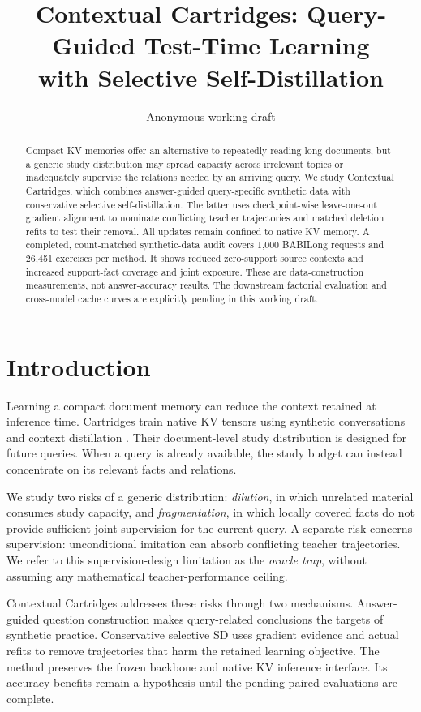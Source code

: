 \documentclass[11pt]{article}
\title{Contextual Cartridges: Query-Guided Test-Time Learning\\with Selective Self-Distillation}
\author{Anonymous working draft}
\begin{document}
\maketitle
\begin{abstract}
Compact KV memories offer an alternative to repeatedly reading long documents, but a generic study distribution may spread capacity across irrelevant topics or inadequately supervise the relations needed by an arriving query. We study Contextual Cartridges, which combines answer-guided query-specific synthetic data with conservative selective self-distillation. The latter uses checkpoint-wise leave-one-out gradient alignment to nominate conflicting teacher trajectories and matched deletion refits to test their removal. All updates remain confined to native KV memory. A completed, count-matched synthetic-data audit covers 1,000 BABILong requests and 26,451 exercises per method. It shows reduced zero-support source contexts and increased support-fact coverage and joint exposure. These are data-construction measurements, not answer-accuracy results. The downstream factorial evaluation and cross-model cache curves are explicitly pending in this working draft.
\end{abstract}

\section{Introduction}
Learning a compact document memory can reduce the context retained at inference time. Cartridges train native KV tensors using synthetic conversations and context distillation \citep{eyuboglu2025cartridges}. Their document-level study distribution is designed for future queries. When a query is already available, the study budget can instead concentrate on its relevant facts and relations.

We study two risks of a generic distribution: \emph{dilution}, in which unrelated material consumes study capacity, and \emph{fragmentation}, in which locally covered facts do not provide sufficient joint supervision for the current query. A separate risk concerns supervision: unconditional imitation can absorb conflicting teacher trajectories. We refer to this supervision-design limitation as the \emph{oracle trap}, without assuming any mathematical teacher-performance ceiling.

Contextual Cartridges addresses these risks through two mechanisms. Answer-guided question construction makes query-related conclusions the targets of synthetic practice. Conservative selective SD uses gradient evidence and actual refits to remove trajectories that harm the retained learning objective. The method preserves the frozen backbone and native KV inference interface. Its accuracy benefits remain a hypothesis until the pending paired evaluations are complete.
\end{document}
